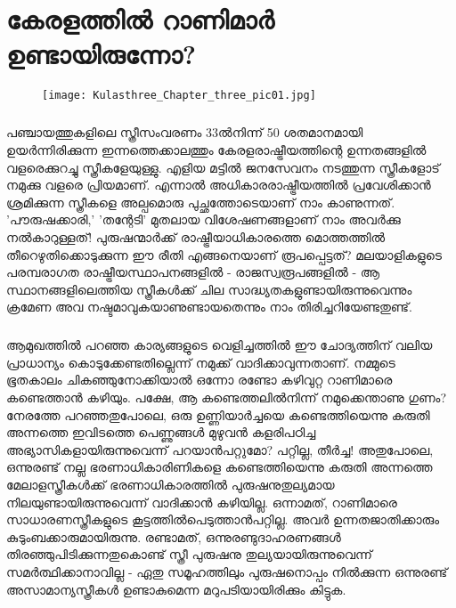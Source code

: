 \chapter{കേരളത്തിൽ റാണിമാർ ഉണ്ടായിരുന്നോ?}
\label{chapter3}
\begin{figure}[h]
\begin{center}
\texttt{[image: Kulasthree\_Chapter\_three\_pic01.jpg]}
\end{center}
\end{figure}

\paragraph{}പഞ്ചായത്തുകളിലെ സ്ത്രീസംവരണം 33ൽനിന്ന് 50 ശതമാനമായി ഉയർന്നിരിക്കുന്ന ഇന്നത്തെക്കാലത്തും കേരളരാഷ്ട്രീയത്തിന്റെ ഉന്നതങ്ങളിൽ വളരെക്കുറച്ചു സ്ത്രീകളേയുള്ളു. എളിയ മട്ടിൽ ജനസേവനം നടത്തുന്ന സ്ത്രീകളോട് നമുക്കു വളരെ പ്രിയമാണ്. എന്നാൽ അധികാരരാഷ്ട്രീയത്തിൽ പ്രവേശിക്കാൻ ശ്രമിക്കുന്ന സ്ത്രീകളെ അല്പമൊരു പുച്ഛത്തോടെയാണ് നാം കാണുന്നത്. 'പൗരുഷക്കാരി,' 'തന്റേടി' മുതലായ വിശേഷണങ്ങളാണ് നാം അവർക്കു നൽകാറുള്ളത്! പുരുഷന്മാർക്ക് രാഷ്ട്രീയാധികാരത്തെ മൊത്തത്തിൽ തീറെഴുതിക്കൊടുക്കുന്ന ഈ രീതി എങ്ങനെയാണ് രൂപപ്പെട്ടത്? മലയാളികളുടെ പരമ്പരാഗത രാഷ്ട്രീയസ്ഥാപനങ്ങളിൽ - രാജസ്വരൂപങ്ങളിൽ - ആ സ്ഥാനങ്ങളിലെത്തിയ സ്ത്രീകൾക്ക് ചില സാദ്ധ്യതകളുണ്ടായിരുന്നുവെന്നും ക്രമേണ അവ നഷ്ടമാവുകയാണുണ്ടായതെന്നും നാം തിരിച്ചറിയേണ്ടതുണ്ട്.

\paragraph{}ആമുഖത്തിൽ പറഞ്ഞ കാര്യങ്ങളുടെ വെളിച്ചത്തിൽ ഈ ചോദ്യത്തിന് വലിയ പ്രാധാന്യം കൊടുക്കേണ്ടതില്ലെന്ന് നമുക്ക് വാദിക്കാവുന്നതാണ്. നമ്മുടെ ഭൂതകാലം ചികഞ്ഞുനോക്കിയാൽ ഒന്നോ രണ്ടോ കഴിവുറ്റ റാണിമാരെ കണ്ടെത്താൻ കഴിയും. പക്ഷേ, ആ കണ്ടെത്തലിൽനിന്ന് നമുക്കെന്താണു ഗുണം? നേരത്തേ പറഞ്ഞതുപോലെ, ഒരു ഉണ്ണിയാർച്ചയെ കണ്ടെത്തിയെന്നു കരുതി അന്നത്തെ ഇവിടത്തെ പെണ്ണുങ്ങൾ മുഴുവൻ കളരിപഠിച്ച അഭ്യാസികളായിരുന്നുവെന്ന് പറയാൻപറ്റുമോ? പറ്റില്ല, തീർച്ച! അതുപോലെ, ഒന്നുരണ്ട് നല്ല ഭരണാധികാരിണികളെ കണ്ടെത്തിയെന്നു കരുതി അന്നത്തെ മേലാളസ്ത്രീകൾക്ക് ഭരണാധികാരത്തിൽ പുരുഷനുതുല്യമായ നിലയുണ്ടായിരുന്നുവെന്ന് വാദിക്കാൻ കഴിയില്ല. ഒന്നാമത്, റാണിമാരെ സാധാരണസ്ത്രീകളുടെ കൂട്ടത്തിൽപെടുത്താൻപറ്റില്ല. അവർ ഉന്നതജാതിക്കാരും കുടുംബക്കാരുമായിരുന്നു. രണ്ടാമത്, ഒന്നുരണ്ടുദാഹരണങ്ങൾ തിരഞ്ഞുപിടിക്കുന്നതുകൊണ്ട് സ്ത്രീ പുരുഷനു തുല്യയായിരുന്നുവെന്ന് സമർത്ഥിക്കാനാവില്ല - ഏതു സമൂഹത്തിലും പുരുഷനൊപ്പം നിൽക്കുന്ന ഒന്നുരണ്ട് അസാമാന്യസ്ത്രീകൾ ഉണ്ടാകുമെന്ന മറുപടിയായിരിക്കും കിട്ടുക.
